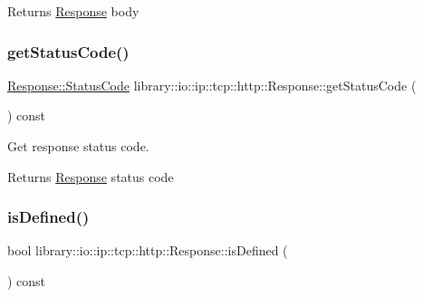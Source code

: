 \begin{DoxyReturn}{Returns}
\hyperlink{classlibrary_1_1io_1_1ip_1_1tcp_1_1http_1_1_response}{Response} body 
\end{DoxyReturn}
\mbox{\label{classlibrary_1_1io_1_1ip_1_1tcp_1_1http_1_1_response_a55725cfcb7ebb735606d01550bbc631f}} 
\subsubsection{\texorpdfstring{get\+Status\+Code()}{getStatusCode()}}
{\footnotesize\ttfamily \hyperlink{classlibrary_1_1io_1_1ip_1_1tcp_1_1http_1_1_response_aa6406ad2157079c939b37c94806069f0}{Response\+::\+Status\+Code} library\+::io\+::ip\+::tcp\+::http\+::\+Response\+::get\+Status\+Code (\begin{DoxyParamCaption}{ }\end{DoxyParamCaption}) const}



Get response status code. 

\begin{DoxyReturn}{Returns}
\hyperlink{classlibrary_1_1io_1_1ip_1_1tcp_1_1http_1_1_response}{Response} status code 
\end{DoxyReturn}
\mbox{\label{classlibrary_1_1io_1_1ip_1_1tcp_1_1http_1_1_response_a8b3d9248f9b87d3d31373258202ca568}} 
\subsubsection{\texorpdfstring{is\+Defined()}{isDefined()}}
{\footnotesize\ttfamily bool library\+::io\+::ip\+::tcp\+::http\+::\+Response\+::is\+Defined (\begin{DoxyParamCaption}{ }\end{DoxyParamCaption}) const}



